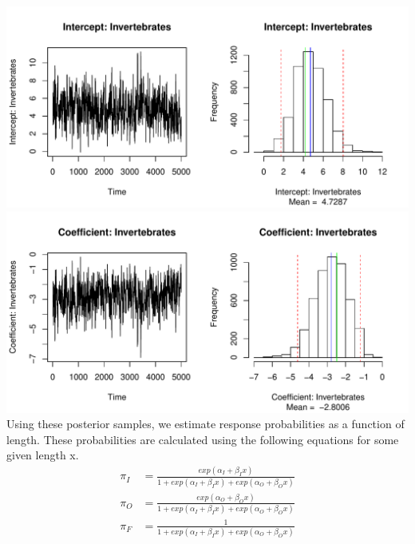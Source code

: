 \documentclass[12pt]{article}
\begin{document}
\begin{enumerate}
\begin{enumerate}[(a)]
	\includegraphics[scale = .7]{plot5.pdf} \\
	\includegraphics[scale = .7]{plot6.pdf} \\
	Using these posterior samples, we estimate response probabilities as a function of length. These probabilities are calculated using the following equations for some given length x. 
	\begin{align*}
	\pi_I &= \frac{exp(\alpha_I + \beta_I x)}{1 + exp(\alpha_I + \beta_I x) + exp(\alpha_O + \beta_O x)} \\ 
	\pi_O &= \frac{exp(\alpha_O + \beta_O x)}{1 + exp(\alpha_I + \beta_I x) + exp(\alpha_O + \beta_O x)} \\
	\pi_F &= \frac{1}{1 + exp(\alpha_I + \beta_I x) + exp(\alpha_O + \beta_O x)}  
	\end{align*}

\end{enumerate}
\end{enumerate}
\end{document}
